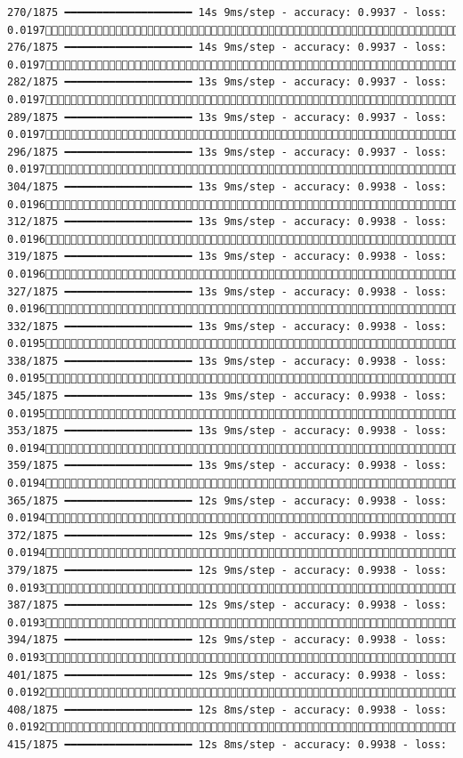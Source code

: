 \documentclass[
  letterpaper,
  DIV=11,
  numbers=noendperiod]{scrreprt}
\begin{document}
\begin{verbatim}
270/1875 ━━━━━━━━━━━━━━━━━━━━ 14s 9ms/step - accuracy: 0.9937 - loss: 0.0197 276/1875 ━━━━━━━━━━━━━━━━━━━━ 14s 9ms/step - accuracy: 0.9937 - loss: 0.0197 282/1875 ━━━━━━━━━━━━━━━━━━━━ 13s 9ms/step - accuracy: 0.9937 - loss: 0.0197 289/1875 ━━━━━━━━━━━━━━━━━━━━ 13s 9ms/step - accuracy: 0.9937 - loss: 0.0197 296/1875 ━━━━━━━━━━━━━━━━━━━━ 13s 9ms/step - accuracy: 0.9937 - loss: 0.0197 304/1875 ━━━━━━━━━━━━━━━━━━━━ 13s 9ms/step - accuracy: 0.9938 - loss: 0.0196 312/1875 ━━━━━━━━━━━━━━━━━━━━ 13s 9ms/step - accuracy: 0.9938 - loss: 0.0196 319/1875 ━━━━━━━━━━━━━━━━━━━━ 13s 9ms/step - accuracy: 0.9938 - loss: 0.0196 327/1875 ━━━━━━━━━━━━━━━━━━━━ 13s 9ms/step - accuracy: 0.9938 - loss: 0.0196 332/1875 ━━━━━━━━━━━━━━━━━━━━ 13s 9ms/step - accuracy: 0.9938 - loss: 0.0195 338/1875 ━━━━━━━━━━━━━━━━━━━━ 13s 9ms/step - accuracy: 0.9938 - loss: 0.0195 345/1875 ━━━━━━━━━━━━━━━━━━━━ 13s 9ms/step - accuracy: 0.9938 - loss: 0.0195 353/1875 ━━━━━━━━━━━━━━━━━━━━ 13s 9ms/step - accuracy: 0.9938 - loss: 0.0194 359/1875 ━━━━━━━━━━━━━━━━━━━━ 13s 9ms/step - accuracy: 0.9938 - loss: 0.0194 365/1875 ━━━━━━━━━━━━━━━━━━━━ 12s 9ms/step - accuracy: 0.9938 - loss: 0.0194 372/1875 ━━━━━━━━━━━━━━━━━━━━ 12s 9ms/step - accuracy: 0.9938 - loss: 0.0194 379/1875 ━━━━━━━━━━━━━━━━━━━━ 12s 9ms/step - accuracy: 0.9938 - loss: 0.0193 387/1875 ━━━━━━━━━━━━━━━━━━━━ 12s 9ms/step - accuracy: 0.9938 - loss: 0.0193 394/1875 ━━━━━━━━━━━━━━━━━━━━ 12s 9ms/step - accuracy: 0.9938 - loss: 0.0193 401/1875 ━━━━━━━━━━━━━━━━━━━━ 12s 9ms/step - accuracy: 0.9938 - loss: 0.0192 408/1875 ━━━━━━━━━━━━━━━━━━━━ 12s 8ms/step - accuracy: 0.9938 - loss: 0.0192 415/1875 ━━━━━━━━━━━━━━━━━━━━ 12s 8ms/step - accuracy: 0.9938 - loss: 
\end{verbatim}
\end{document}
